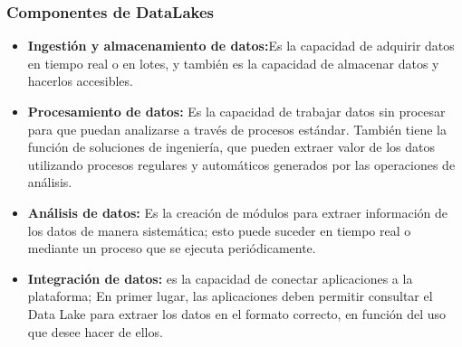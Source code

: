 \documentclass[%
 reprint,
 amsmath,amssymb,
 aps,
]{revtex4-1}
\begin{document}
\subsubsection{\textbf{Componentes de DataLakes}}

\begin{itemize}
	\item \textbf{ Ingestión y almacenamiento de datos:}Es la capacidad de adquirir datos en tiempo real o en lotes, y también es la capacidad de almacenar datos y hacerlos accesibles.\cite{referenciasosa3}
	\item  \textbf{Procesamiento de datos:} Es la capacidad de trabajar datos sin procesar para que puedan analizarse a través de procesos estándar. 
También tiene la función de soluciones de ingeniería, que pueden extraer valor de los datos utilizando procesos regulares y automáticos generados por las operaciones de análisis.
	\item  \textbf{ Análisis de datos:} Es la creación de módulos para extraer información de los datos de manera sistemática; esto puede suceder en tiempo real o mediante un proceso que se ejecuta periódicamente.
	\item  \textbf{Integración de datos:} es la capacidad de conectar aplicaciones a la plataforma; En primer lugar, las aplicaciones deben permitir consultar el Data Lake para extraer los datos en el formato correcto, en función del uso que desee hacer de ellos.
\end{itemize}

\end{document}
